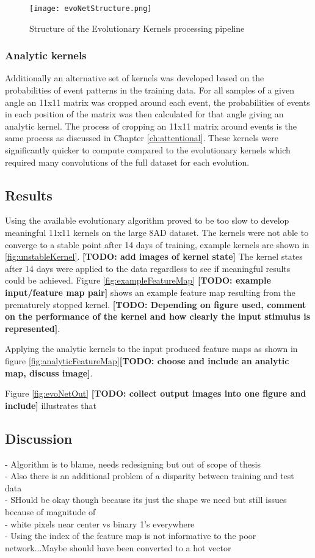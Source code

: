 \begin{figure}[h]
    \centering
    \texttt{[image: evoNetStructure.png]}
    \caption{Structure of the Evolutionary Kernels processing pipeline}
    \label{fig:evoNetStructure}
\end{figure}


\subsubsection{Analytic kernels}
Additionally an alternative set of kernels was developed based on the probabilities of event patterns in the training data.
For all samples of a given angle an 11x11 matrix was cropped around each event, the probabilities of events in each position of the matrix was then calculated for that angle giving an analytic kernel.
The process of cropping an 11x11 matrix around events is the same process as discussed in Chapter \ref{ch:attentional}.
These kernels were significantly quicker to compute compared to the evolutionary kernels which required many convolutions of the full dataset for each evolution. 

\subsection{Results}
Using the available evolutionary algorithm proved to be too slow to develop meaningful 11x11 kernels on the large 8AD dataset.
The kernels were not able to converge to a stable point after 14 days of training, example kernels are shown in \ref{fig:unstableKernel}. \textbf{[TODO: add images of kernel state]}
The kernel states after 14 days were applied to the data regardless to see if meaningful results could be achieved. 
Figure \ref{fig:exampleFeatureMap} \textbf{[TODO: example input/feature map pair]} shows an example feature map resulting from the prematurely stopped kernel. 
\textbf{[TODO: Depending on figure used, comment on the performance of the kernel and how clearly the input stimulus is represented]}.

Applying the analytic kernels to the input produced feature maps as shown in figure \ref{fig:analyticFeatureMap}\textbf{[TODO: choose and include an analytic map, discuss image]}.

Figure \ref{fig:evoNetOut} \textbf{[TODO: collect output images into one figure and include]} illustrates that  
\subsection{Discussion}
 - Algorithm is to blame, needs redesigning but out of scope of thesis
\\ - Also there is an additional problem of a disparity between training and test data
\\ - SHould be okay though because its just the shape we need but still issues because of magnitude of
\\ - white pixels near center vs binary 1's everywhere
\\ - Using the index of the feature map is not informative to the poor network...Maybe should have been converted to a hot vector


